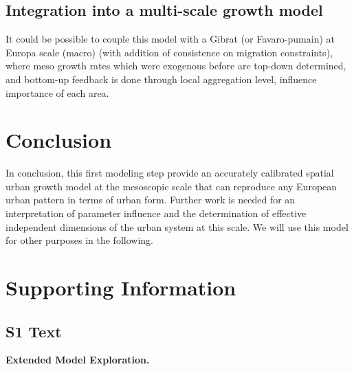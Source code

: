 \documentclass[10pt,letterpaper,draft]{article}
\begin{document}



\subsection*{Integration into a multi-scale growth model}

It could be possible to couple this model with a Gibrat (or Favaro-pumain) at Europa scale (macro) (with addition of consistence on migration constraints), where meso growth rates which were exogenous before are top-down determined, and bottom-up feedback is done through local aggregation level, influence importance of each area.


\cite{zhang2013identifying}






\section*{Conclusion}


In conclusion, this first modeling step provide an accurately calibrated spatial urban growth model at the mesoscopic scale that can reproduce any European urban pattern in terms of urban form. Further work is needed for an interpretation of parameter influence and the determination of effective independent dimensions of the urban system at this scale. We will use this model for other purposes in the following.





\section*{Supporting Information}



\subsection*{S1 Text}
\label{S1_Text}
{\bf Extended Model Exploration.}
\end{document}
